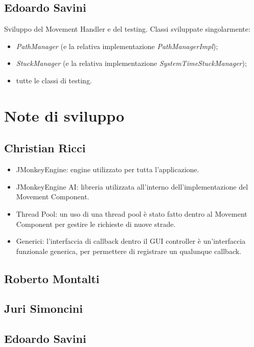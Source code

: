 \subsection{Edoardo Savini}

Sviluppo del Movement Handler e del testing.
Classi sviluppate singolarmente:
\begin{itemize}
    \item \emph{PathManager} (e la relativa implementazione \emph{PathManagerImpl});
    \item \emph{StuckManager} (e la relativa implementazione \emph{SystemTimeStuckManager});
    \item tutte le classi di testing.
\end{itemize}

\section{Note di sviluppo}

\subsection{Christian Ricci}

\begin{itemize}
\item JMonkeyEngine: engine utilizzato per tutta l'applicazione.
\item JMonkeyEngine AI: libreria utilizzata all'interno dell'implementazione del Movement Component.
\item Thread Pool: un uso di una thread pool è stato fatto dentro al Movement Component per gestire le richieste di nuove strade.
\item Generici: l'interfaccia di callback dentro il GUI controller è un'interfaccia funzionale generica, per permettere di registrare un qualunque callback.
\end{itemize}

\subsection{Roberto Montalti}

\subsection{Juri Simoncini}

\subsection{Edoardo Savini}

